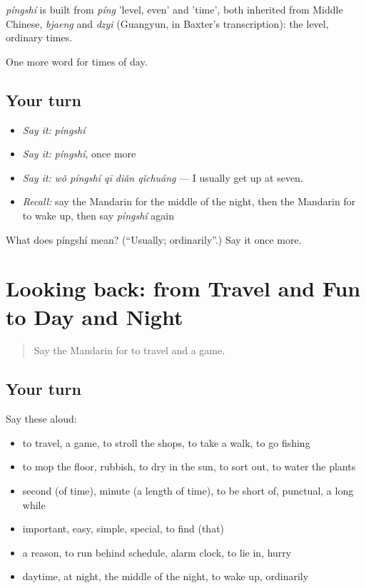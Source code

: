 \begin{cousinweb}
\emph{píngshí} is built from \emph{píng} 'level, even' and  'time', both inherited from Middle Chinese, \emph{bjaeng} and \emph{dzyi} (Guangyun, in Baxter's transcription): the level, ordinary times.
\end{cousinweb}

\begin{grammarlens}[title={What you've built}]
One more word for times of day.
\end{grammarlens}

\subsection*{Your turn}
\begin{itemize}
\raggedright
  \item \emph{Say it:} \emph{píngshí}
  \item \emph{Say it:} \emph{píngshí}, once more
  \item \emph{Say it:} \emph{wǒ píngshí qī diǎn qǐchuáng} — I usually get up at seven.
  \item \emph{Recall:} say the Mandarin for the middle of the night, then the Mandarin for to wake up, then say \emph{píngshí} again
\end{itemize}

\begin{tcolorbox}[breakable,colback=teal!4,colframe=teal!35!black,title={Before you move on}]
What does píngshí mean? (\textquotedblleft{}Usually; ordinarily\textquotedblright{}.) Say it once more.
\end{tcolorbox}
\section[(dialogue)]{Looking back: from Travel and Fun to Day and Night}

\label{lesson:ZH-R146-review-141-146}



\begin{quote}
Say the Mandarin for to travel and a game.
\end{quote}

\subsection*{Your turn}
Say these aloud:

\begin{itemize}
\raggedright
  \item to travel, a game, to stroll the shops, to take a walk, to go fishing
  \item to mop the floor, rubbish, to dry in the sun, to sort out, to water the plants
  \item second (of time), minute (a length of time), to be short of, punctual, a long while
  \item important, easy, simple, special, to find (that)
  \item a reason, to run behind schedule, alarm clock, to lie in, hurry
  \item daytime, at night, the middle of the night, to wake up, ordinarily
\end{itemize}


